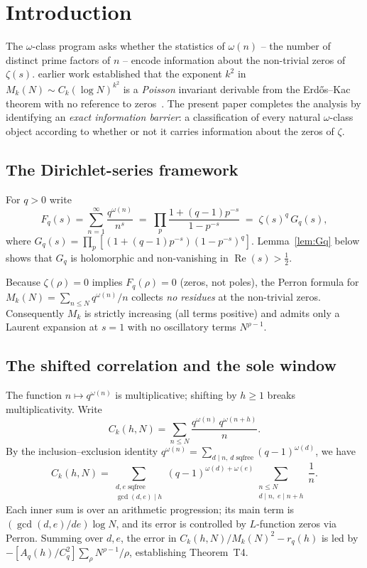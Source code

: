 \documentclass[11pt]{amsart}
\theoremstyle{definition}
\theoremstyle{remark}
\renewcommand{\Re}{\operatorname{Re}}
\newcommand{\half}{\tfrac12}
\newcommand{\om}{\omega}
\begin{document}
\tableofcontents
\newpage

\section{Introduction}
The $\om$-class program asks whether the statistics of $\om(n)$ -- the number of
distinct prime factors of $n$ -- encode information about the non-trivial zeros of
$\zeta(s)$.  earlier work established that the exponent $k^2$ in
$M_k(N)\sim C_k(\log N)^{k^2}$ is a \emph{Poisson} invariant derivable from
the Erd\H{o}s--Kac theorem with no reference to zeros~\cite{RP9}.  The present paper
completes the analysis by identifying an \emph{exact information barrier}: a
classification of every natural $\om$-class object according to whether or not it
carries information about the zeros of $\zeta$.

\subsection*{The Dirichlet-series framework}

For $q>0$ write
\[
  F_q(s) = \sum_{n=1}^\infty \frac{q^{\om(n)}}{n^s}
  \;=\; \prod_p \frac{1+(q-1)p^{-s}}{1-p^{-s}}
  \;=\; \zeta(s)^q\,G_q(s),
\]
where $G_q(s) = \prod_p[(1+(q-1)p^{-s})(1-p^{-s})^q]$.
Lemma~\ref{lem:Gq} below shows that $G_q$ is holomorphic and non-vanishing in
$\Re(s)>\half$.

Because $\zeta(\rho)=0$ implies $F_q(\rho)=0$ (zeros, not poles), the Perron formula for
$M_k(N) = \sum_{n\le N}q^{\om(n)}/n$ collects \emph{no residues} at the non-trivial
zeros.  Consequently $M_k$ is strictly increasing (all terms positive) and admits only
a Laurent expansion at $s=1$ with no oscillatory terms $N^{\rho-1}$.

\subsection*{The shifted correlation and the sole window}

The function $n\mapsto q^{\om(n)}$ is multiplicative; shifting by $h\ge 1$ breaks
multiplicativity.  Write
\[
  C_k(h,N) = \sum_{n\le N}\frac{q^{\om(n)}\,q^{\om(n+h)}}{n}.
\]
By the inclusion--exclusion identity
$q^{\om(n)}=\sum_{d\mid n,\,d\text{ sqfree}}(q-1)^{\om(d)}$, we have
\[
  C_k(h,N) = \sum_{\substack{d,e\text{ sqfree}\\\gcd(d,e)\mid h}}
              (q-1)^{\om(d)+\om(e)}
              \sum_{\substack{n\le N\\d\mid n,\;e\mid n+h}}\frac{1}{n}.
\]
Each inner sum is over an arithmetic progression; its main term is
$(\gcd(d,e)/de)\log N$, and its error is controlled by $L$-function zeros via Perron.
Summing over $d,e$, the error in $C_k(h,N)/M_k(N)^2-r_q(h)$ is led by
$-[A_q(h)/C_q^2]\sum_\rho N^{\rho-1}/\rho$, establishing Theorem~T4.
\end{document}
